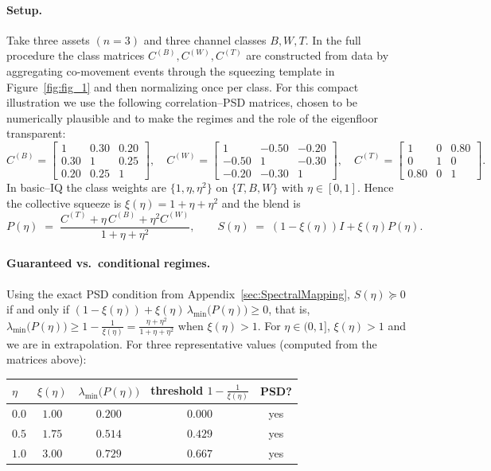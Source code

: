 \documentclass[12pt,letterpaper]{article}
\begin{document}
\paragraph{Setup.}
Take three assets \((n=3)\) and three channel classes \(B,W,T\).
In the full procedure the class matrices \(C^{(B)},C^{(W)},C^{(T)}\) are constructed from data by aggregating co-movement events through the squeezing template in Figure~\ref{fig:fig_1} and then normalizing once per class.
For this compact illustration we use the following correlation--PSD matrices, chosen to be numerically plausible and to make the regimes and the role of the eigenfloor transparent:
\[
C^{(B)}=
\begin{bmatrix}
1 & 0.30 & 0.20\\
0.30 & 1 & 0.25\\
0.20 & 0.25 & 1
\end{bmatrix},\quad
C^{(W)}=
\begin{bmatrix}
1 & -0.50 & -0.20\\
-0.50 & 1 & -0.30\\
-0.20 & -0.30 & 1
\end{bmatrix},\quad
C^{(T)}=
\begin{bmatrix}
1 & 0 & 0.80\\
0 & 1 & 0\\
0.80 & 0 & 1
\end{bmatrix}.
\]
In basic--IQ the class weights are \(\{1,\eta,\eta^2\}\) on \(\{T,B,W\}\) with \(\eta\in[0,1]\).
Hence the collective squeeze is \(\xi(\eta)=1+\eta+\eta^2\) and the blend is
\begin{equation}
\label{eq:P-eta-compact}
P(\eta)\;=\;\frac{C^{(T)}+\eta\,C^{(B)}+\eta^{2}C^{(W)}}{\,1+\eta+\eta^{2}\,},\qquad
S(\eta)\;=\;(1-\xi(\eta))I+\xi(\eta)P(\eta).
\end{equation}

\paragraph{Guaranteed vs.\ conditional regimes.}
Using the exact PSD condition from Appendix~\ref{sec:SpectralMapping}, \(S(\eta)\succeq 0\) if and only if
\((1-\xi(\eta))+\xi(\eta)\,\lambda_{\min}\!\big(P(\eta)\big)\ge 0\), that is,
\(\lambda_{\min}\!\big(P(\eta)\big)\ge 1-\tfrac{1}{\xi(\eta)}=\tfrac{\eta+\eta^2}{1+\eta+\eta^2}\) when \(\xi(\eta)>1\).
For \(\eta\in(0,1]\), \(\xi(\eta)>1\) and we are in extrapolation.
For three representative values (computed from the matrices above):

\medskip
\begin{center}
\begin{tabular}{@{}lcccc@{}}
\toprule
\(\eta\) & \(\xi(\eta)\) & \(\lambda_{\min}\!\big(P(\eta)\big)\) & threshold \(1-\tfrac{1}{\xi(\eta)}\) & PSD? \\
\midrule
\(0.0\) & \(1.00\) & \(0.200\) & \(0.000\) & yes \\
\(0.5\) & \(1.75\) & \(0.514\) & \(0.429\) & yes \\
\(1.0\) & \(3.00\) & \(0.729\) & \(0.667\) & yes \\
\bottomrule
\end{tabular}
\end{center}
\par\medskip
\end{document}
